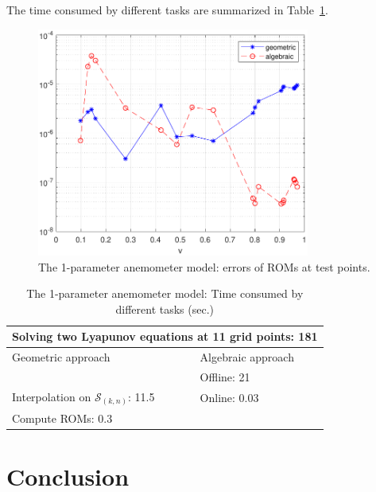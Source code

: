 The time consumed by different tasks are summarized in Table~\ref{tab:TimeConsumedExample2}. 


\begin{figure}[th]
	\begin{center}
		\includegraphics[width=0.8\textwidth]{pdfFIG/err_both_rand_rng0.pdf}
	\caption{The 1-parameter anemometer model: errors of ROMs at test points.}
	\label{fig:example2}
\end{center}
\end{figure}

\begin{table}
	\begin{center}
\begin{tabular}{ |p{5cm}|p{5cm}|  }
	\hline
	\multicolumn{2}{|c|}{Solving two Lyapunov equations at 11 grid points: 181} \\
	\hline
	Geometric approach& Algebraic approach \\
	\hline
	   & Offline: 21 \\
	   \hline
	Interpolation on $\mathcal{S}_(k,n)$: 11.5 & Online: 0.03\\
	Compute ROMs: 0.3 &\\
	\hline
\end{tabular}
\caption{The 1-parameter anemometer model: Time consumed by different tasks (sec.)}
\label{tab:TimeConsumedExample2}
\end{center}
\end{table}

\section{Conclusion}\label{Sec:Concl}




